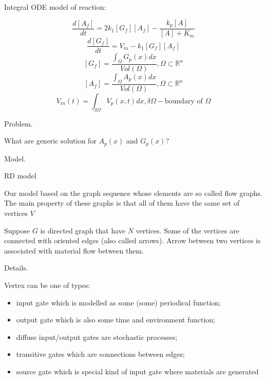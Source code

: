 \documentclass[11pt,a4paper]{article}
\author{Irus Grinis}
\begin{document}
Integral ODE model of reaction:


$$ \frac{d[A_f]}{dt} = 2k_1[G_f][A_f] - \frac{k_p[A]}{[A]+K_m}$$ 
$$ \frac{d[G_f]}{dt} = V_{in} - k_1[G_f][A_f]$$
$$ [G_f] = \frac{\int_{\Omega} G_p(x)dx}{Vol(\Omega)}, \Omega \subset \mathbb{R}^n $$
$$ [A_f] = \frac{\int_{\Omega} A_p(x)dx}{Vol(\Omega)}, \Omega \subset \mathbb{R}^n $$
$$ V_{in}(t) = \int_{\delta \Omega} V_p(x,t)dx, \delta \Omega - \mbox{boundary of } \Omega $$

Problem.

What are generic solution for $A_p(x)$ and $G_p(x)$?
 
Model.

 
%
%
%
%
%
%
%
%
%


RD model

Our model based on the graph sequence whose elements are so called flow graphs.  The main property of these graphs is that all of them have the same set of vertices $V$

Suppose $G$ is directed graph that have $N$ vertices. Some of the vertices are connected with oriented edges (also called arrows). Arrow between two vertices is associated with material flow between them.


Details.

Vertex can be one of types:

\begin{itemize}
\item input gate which is modelled as some (some) periodical function;
\item output gate which is also some time and environment function;
\item diffuse input/output gates are stochastic processes;
\item transitive gates which are connections between edges;
\item source gate which is special kind of input gate where materials are generated  
\end{itemize}
\end{document}
